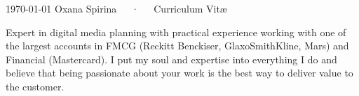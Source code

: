 \documentclass[11pt, a4paper]{awesome-cv}
\begin{document}
\makecvheader[C]

\makecvfooter
  {\today}
  {Oxana Spirina~~~·~~~Curriculum Vitæ}
  {\thepage}


%
%
%
%
%
%
%
%


\begin{cvparagraph}
	Expert in digital media planning with practical experience working with one of the largest accounts in FMCG (Reckitt Benckiser, GlaxoSmithKline, Mars) and Financial (Mastercard). I put my soul and expertise into everything I do and believe that being passionate about your work is the best way to deliver value to the customer.
\end{cvparagraph}
\end{document}
